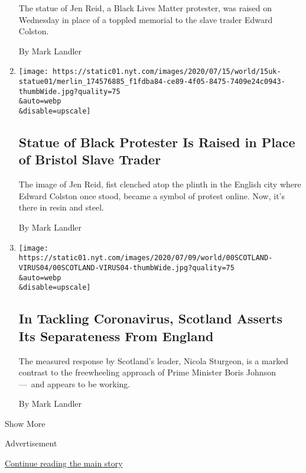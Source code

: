 \begin{enumerate}
  The statue of Jen Reid, a Black Lives Matter protester, was raised on
  Wednesday in place of a toppled memorial to the slave trader Edward
  Colston.

  By Mark Landler
\item
  \href{/2020/07/15/world/europe/bristol-statue-black-lives-matter.html}{}

  \texttt{[image: https://static01.nyt.com/images/2020/07/15/world/15uk-statue01/merlin\_174576885\_f1fdba84-ce89-4f05-8475-7409e24c0943-thumbWide.jpg?quality=75\\\&auto=webp\\\&disable=upscale]}

  \hypertarget{statue-of-black-protester-is-raised-in-place-of-bristol-slave-trader}{%
  \subsection{Statue of Black Protester Is Raised in Place of Bristol
  Slave
  Trader}\label{statue-of-black-protester-is-raised-in-place-of-bristol-slave-trader}}

  The image of Jen Reid, fist clenched atop the plinth in the English
  city where Edward Colston once stood, became a symbol of protest
  online. Now, it's there in resin and steel.

  By Mark Landler
\item
  \href{/2020/07/10/world/europe/coroanvirus-scotland-england.html}{}

  \texttt{[image: https://static01.nyt.com/images/2020/07/09/world/00SCOTLAND-VIRUS04/00SCOTLAND-VIRUS04-thumbWide.jpg?quality=75\\\&auto=webp\\\&disable=upscale]}

  \hypertarget{in-tackling-coronavirus-scotland-asserts-its-separateness-from-england}{%
  \subsection{In Tackling Coronavirus, Scotland Asserts Its Separateness
  From
  England}\label{in-tackling-coronavirus-scotland-asserts-its-separateness-from-england}}

  The measured response by Scotland's leader, Nicola Sturgeon, is a
  marked contrast to the freewheeling approach of Prime Minister Boris
  Johnson ---~and appears to be working.

  By Mark Landler
\end{enumerate}

Show More

Advertisement

\protect\hyperlink{after-mid2}{Continue reading the main story}


